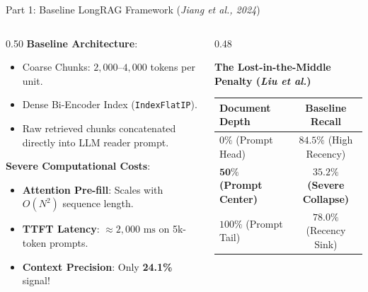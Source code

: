\documentclass[10pt,aspectratio=169]{beamer}
\begin{document}
\begin{frame}{Part 1: Baseline LongRAG Framework (\textit{Jiang et al., 2024})}
    \begin{columns}[onlytextwidth,T]
        \begin{column}{0.50\textwidth}
            \textbf{Baseline Architecture}:
            \begin{itemize}\setlength\itemsep{3pt}
                \item Coarse Chunks: $2,000$--$4,000$ tokens per unit.
                \item Dense Bi-Encoder Index (\texttt{IndexFlatIP}).
                \item Raw retrieved chunks concatenated directly into LLM reader prompt.
            \end{itemize}
            
            \vspace{0.15cm}
            \textbf{Severe Computational Costs}:
            \begin{itemize}\setlength\itemsep{2pt}
                \item \textbf{Attention Pre-fill}: Scales with $O(N^2)$ sequence length.
                \item \textbf{TTFT Latency}: $\approx 2,000\text{ ms}$ on 5k-token prompts.
                \item \textbf{Context Precision}: Only \textbf{24.1\%} signal!
            \end{itemize}
        \end{column}
        
        \begin{column}{0.48\textwidth}
            \begin{alertblock}{\textbf{The Lost-in-the-Middle Penalty (\textit{Liu et al.})}}
                \centering
                \scriptsize
                \begin{tabular}{lc}
                    \toprule
                    \textbf{Document Depth} & \textbf{Baseline Recall} \\
                    \midrule
                    $0\%$ (Prompt Head) & $84.5\%$ (High Recency) \\
                    $\mathbf{50\%}$ \textbf{(Prompt Center)} & $\mathbf{35.2\%}$ \textbf{(Severe Collapse)} \\
                    $100\%$ (Prompt Tail) & $78.0\%$ (Recency Sink) \\
                    \bottomrule
                \end{tabular}
            \end{alertblock}
            

\end{column}
\end{columns}
\end{frame}
\end{document}
